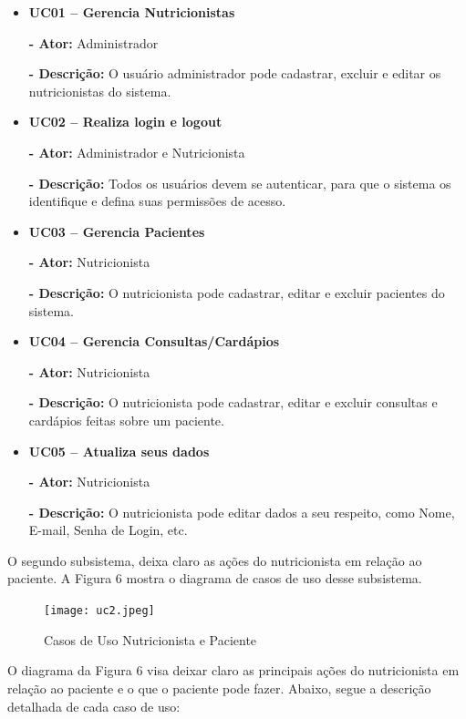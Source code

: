 \documentclass[
	12pt,				%
    oneside,			%
	a4paper,			%
	english,			%
	french,				%
	spanish,			%
	brazil,				%
	]{abntex2}
\begin{document}
\begin{itemize}
\item \textbf{UC01 – Gerencia Nutricionistas}

\textbf{- Ator:} Administrador

\textbf{- Descrição:} O usuário administrador pode cadastrar, excluir e
editar os nutricionistas do sistema.

\item \textbf{UC02 – Realiza login e logout}

\textbf{- Ator:} Administrador e Nutricionista

\textbf{- Descrição:} Todos os usuários devem se autenticar, para que o
sistema os identifique e defina suas permissões de acesso.

\item \textbf{UC03 – Gerencia Pacientes}

\textbf{- Ator:} Nutricionista

\textbf{- Descrição:} O nutricionista pode cadastrar, editar e excluir
pacientes do sistema.

\item \textbf{UC04 – Gerencia Consultas/Cardápios}

\textbf{- Ator:} Nutricionista

\textbf{- Descrição:} O nutricionista pode cadastrar, editar e excluir
consultas e cardápios feitas sobre um paciente.

\item \textbf{UC05 – Atualiza seus dados}

\textbf{- Ator:} Nutricionista

\textbf{- Descrição:} O nutricionista pode editar dados a seu respeito,
como Nome, E-mail, Senha de Login, etc.

\end{itemize}

O segundo subsistema, deixa claro as ações do nutricionista em relação ao
paciente. A Figura 6 mostra o diagrama de casos de uso desse subsistema.

\begin{figure} [hbt] 
\label{table1} 
\caption{Casos de Uso Nutricionista e Paciente}
\begin{center}
\texttt{[image: uc2.jpeg]}
\end{center}
\end{figure}

O diagrama da Figura 6 visa deixar claro as principais ações do nutricionista
em relação ao paciente e o que o paciente pode fazer. Abaixo, segue a descrição
detalhada de cada caso de uso:
\end{document}
